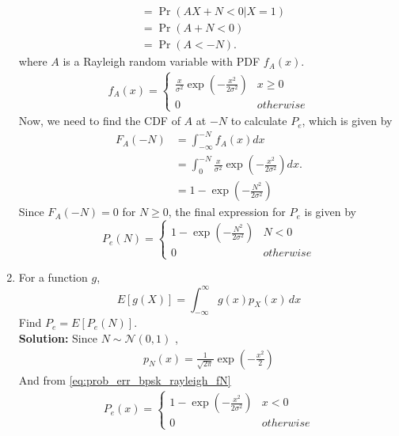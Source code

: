 \documentclass[12pt]{book}
\providecommand{\pr}[1]{\ensuremath{\Pr\left(#1\right)}}
\providecommand{\sbrak}[1]{\ensuremath{{}\left[#1\right]}}
\providecommand{\brak}[1]{\ensuremath{\left(#1\right)}}
\newcommand{\solution}{\noindent \textbf{Solution: }}
\providecommand{\gauss}[2]{\mathcal{N}\ensuremath{\left(#1,#2\right)}}
\begin{document}
\begin{enumerate}
\begin{align}
&= \pr{AX + N < 0|X=1} \\
&= \pr{A + N < 0} \\
&= \pr{A < -N}.
\end{align}
where $A$ is a Rayleigh random variable with PDF $f_A(x)$.
\begin{align}
f_A(x) = 
\begin{cases}
\frac{x}{\sigma^2}\exp\brak{{-\frac{x^2}{2\sigma^2}}} & x\geq0\\
0 & otherwise
\end{cases}
\end{align}
Now, we need to find the CDF of $A$ at $-N$ to calculate $P_e$, which is given by
\begin{align}
 F_A(-N)&=\int_{-\infty}^{-N} f_A(x)dx\\
&= \int_{0}^{-N} \frac{x}{\sigma^2} \exp\left(-\frac{x^2}{2\sigma^2}\right) dx.\\
 &=1-\exp{\brak{-\frac{N^2}{2\sigma^2}}}
\end{align}
Since $F_A(-N) = 0$ for $N \ge 0$, the final expression for $P_e$ is given by
\begin{equation}
\label{eq:prob_err_bpsk_rayleigh_fN}
P_e(N) = 
\begin{cases}
1-\exp\brak{{-\frac{N^2}{2\sigma^2}}} & N<0\\
0 & otherwise
\end{cases}
\end{equation}
\item
%
\label{ch4_anal}
For a function $g$,
\begin{equation}
E\sbrak{g(X)} = \int_{-\infty}^{\infty}g(x)p_{X}(x)\, dx
\end{equation}
%
Find $P_e = E\sbrak{P_e(N)}$.\\
\solution
Since $N \sim \gauss{0}{1}$ ,
\begin{align}
  p_N(x)= \frac{1}{\sqrt{2\pi}}\exp \brak{-\frac{x^2}{2} }
\end{align}
And from \eqref{eq:prob_err_bpsk_rayleigh_fN} 
\begin{align}
    P_e(x)=
    \begin{cases}
1-\exp\brak{{-\frac{x^2}{2\sigma^2}}} & x<0\\
0 & otherwise
\end{cases}
\end{align}


\end{enumerate}
\end{document}
